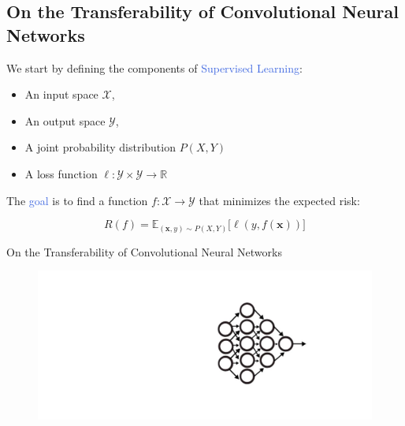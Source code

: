 \documentclass{beamer}
\renewcommand{\vec}[1]{\mathbf{#1}
}
\begin{document}
\begin{frame}
	\subsection{On the Transferability of Convolutional Neural Networks}

	We start by defining the components of \textcolor{RoyalBlue}{Supervised Learning}:

	\begin{itemize}
		\item An input space $\mathcal{X}$,
		\item An output space $\mathcal{Y}$,
		\item A joint probability distribution $P(X,Y)$
		\item A loss function $\ell: \mathcal{Y} \times \mathcal{Y} \rightarrow \mathds{R}$
	\end{itemize}

	\bigskip

	The \textcolor{RoyalBlue}{goal} is to find a function $f:\mathcal{X}\rightarrow\mathcal{Y}$ that minimizes the expected risk:

	\begin{equation*}
		R(f) = \mathds{E}_{(\vec{x},y)\sim P(X,Y)} \big[\ell(y,f(\vec{x}))\big]
	\end{equation*}
\end{frame}


\begin{frame}{On the Transferability of Convolutional Neural Networks}
	\bigskip

	\begin{figure}
		\includegraphics[width=1.2\textwidth]{figures/tl_}
	\end{figure}
	 
\end{frame}
\end{document}
